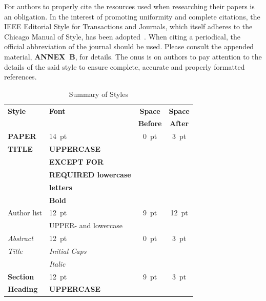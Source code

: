 \documentclass[a4paper,
               keeplastbox,   %
               ]{jacow}
\begin{document}
For authors to properly cite the resources used when researching
their papers is an obligation. In the interest of
promoting uniformity and complete citations, the IEEE
Editorial Style for Transactions and Journals, which itself 
adheres to the Chicago Manual of Style, has been adopted~\cite{IEEE}. 
When citing a periodical, the official abbreviation of the journal 
should be used\cite{journal-abbreviations}.
Please consult the appended material, \textbf{ANNEX~B},
for details. The onus is on authors to pay attention to
the details of the said style to ensure complete, accurate
and properly formatted references.

  \begin{table}[h!b]
	\setlength\tabcolsep{3.5pt}
	\centering
	\caption{Summary of Styles}
	\label{tab:styles}
	\begin{tabular}{llcc}
		\toprule
		\textbf{Style} & \textbf{Font}               & \textbf{Space}  & \textbf{Space} \\
		&                             & \textbf{Before} & \textbf{After} \\
		\midrule
		\textbf{PAPER}  & \SI{14}{pt}                 & \SI{0}{pt}      & \SI{3}{pt}  \\
		\textbf{TITLE}  & \textbf{UPPERCASE}          &                 &      \\
		& \textbf{EXCEPT FOR}         &                 &      \\
		& \textbf{REQUIRED lowercase} &                 &      \\
		& \textbf{letters}            &                 &      \\
		& \textbf{Bold}               &                 &      \\[5pt]
		Author list  & \SI{12}{pt}                 & \SI{9}{pt}      & \SI{12}{pt} \\
		& UPPER- and lowercase        &                 &      \\[5pt]
		\textit{Abstract} & \SI{12}{pt}                 & \SI{0}{pt}      & \SI{3}{pt} \\
		\textit{Title}  & \textit{Initial Caps}       &                 &      \\
		& \textit{Italic}             &                 &      \\[5pt]
		\textbf{Section}  & \SI{12}{pt}                 & \SI{9}{pt}      & \SI{3}{pt}  \\
		\textbf{Heading}  & \textbf{UPPERCASE}          &                 &      \\

\end{tabular}
\end{table}
\end{document}
